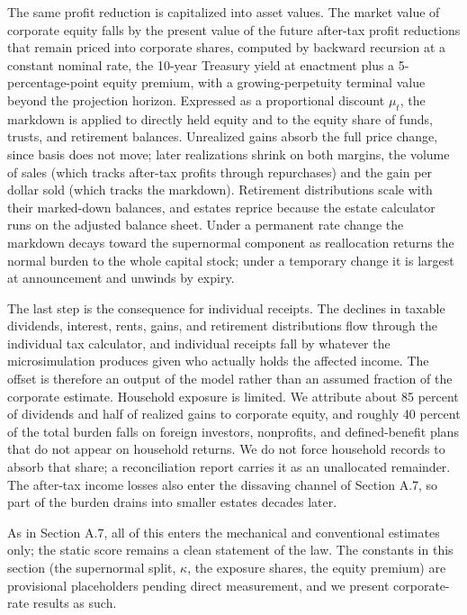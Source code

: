 \documentclass[10pt,twocolumn]{article}
\begin{document}
The same profit reduction is capitalized into asset values. The market value of corporate
equity falls by the present value of the future after-tax profit reductions
that remain priced into corporate shares, computed by backward recursion at a
constant nominal rate, the 10-year Treasury yield at enactment plus a
5-percentage-point equity premium, with a growing-perpetuity terminal value
beyond the projection horizon. Expressed as a proportional discount $\mu_t$,
the markdown is applied to directly held equity and to the equity share of
funds, trusts, and retirement balances. Unrealized gains absorb the full price
change, since basis does not move; later realizations shrink on both margins,
the volume of sales (which tracks after-tax profits through repurchases) and
the gain per dollar sold (which tracks the markdown). Retirement distributions
scale with their marked-down balances, and estates reprice because the estate calculator runs on the adjusted balance
sheet. Under a
permanent rate change the markdown decays toward the supernormal component as
reallocation returns the normal burden to the whole capital stock; under a
temporary change it is largest at announcement and unwinds by expiry.

The last step is the consequence for individual receipts. The declines in
taxable dividends, interest, rents, gains, and retirement distributions flow
through the individual tax calculator, and individual receipts fall by
whatever the microsimulation produces given who actually holds the affected
income. The offset is therefore an output of the model rather than an assumed
fraction of the corporate estimate. Household exposure is limited. We
attribute about 85 percent of dividends and half of realized gains to
corporate equity, and roughly 40
percent of the total burden falls on foreign investors, nonprofits, and
defined-benefit plans that do not appear on household returns. We do not
force household records to absorb that share; a reconciliation report carries
it as an unallocated remainder. The after-tax income losses also enter the dissaving channel of Section A.7, so part of the burden drains into smaller estates
decades later.

As in Section A.7, all of this enters the mechanical and conventional estimates
only; the static score remains a clean statement of the law. The constants in this
section (the supernormal split, $\kappa$, the exposure shares, the equity
premium) are provisional placeholders pending direct measurement, and we
present corporate-rate results as such.
\end{document}
